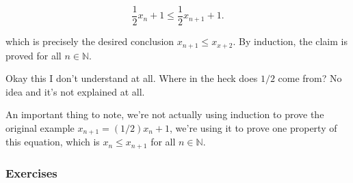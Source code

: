 \documentclass{article}
\numberwithin{equation}{subsection}
\numberwithin{theo}{subsection}
\begin{document}
\begin{equation*}
    \frac{1}{2}x_n + 1 \leq \frac{1}{2} x_{n+1} + 1.
\end{equation*}

which is precisely the desired conclusion $x_{n+1} \leq x_{x+2}$. By induction,
the claim is proved for all $n \in \mathbb{N}$.

Okay this I don't understand at all. Where in the heck does $1/2$ come from? No
idea and it's not explained at all.

An important thing to note, we're not actually using induction to prove the
original example $x_{n+1} = (1/2)x_n + 1$, we're using it to prove one property
of this equation, which is $x_n \leq x_{n+1}$ for all $n \in \mathbb{N}$.


\subsubsection*{Exercises}
\end{document}
